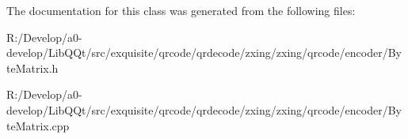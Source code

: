 The documentation for this class was generated from the following files\+:\begin{DoxyCompactItemize}
\item 
R\+:/\+Develop/a0-\/develop/\+Lib\+Q\+Qt/src/exquisite/qrcode/qrdecode/zxing/zxing/qrcode/encoder/Byte\+Matrix.\+h\item 
R\+:/\+Develop/a0-\/develop/\+Lib\+Q\+Qt/src/exquisite/qrcode/qrdecode/zxing/zxing/qrcode/encoder/Byte\+Matrix.\+cpp\end{DoxyCompactItemize}
